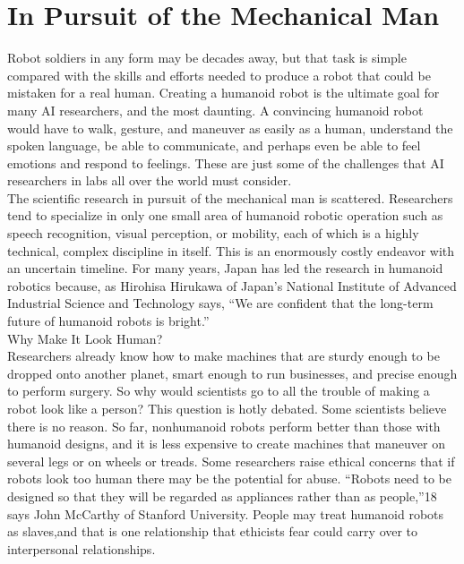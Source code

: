 \documentclass[12pt]{article}
\begin{document}
\section{\textbf{In Pursuit of the Mechanical Man}}
\large\flushleft 

Robot soldiers in any form may be decades away, but that task is simple compared with the skills and efforts needed to produce a robot that could be mistaken for a real human. Creating a humanoid robot is the ultimate goal for many AI researchers, and the most daunting. A convincing humanoid robot would have to walk, gesture, and maneuver as easily as a human, understand the spoken language, be able to communicate, and perhaps even be able to feel emotions and respond to feelings. These are just some of the challenges that AI researchers in labs all over the world must consider.\\
 The scientific research in pursuit of the mechanical man is scattered. Researchers tend to specialize in only one small area of humanoid robotic operation such as speech recognition, visual perception, or mobility, each of which is a highly technical, complex discipline in itself. This is an enormously costly endeavor with an uncertain timeline. For many years, Japan has led the research in humanoid robotics because, as Hirohisa Hirukawa of Japan’s National Institute of Advanced Industrial Science and Technology says, “We are confident that the long-term future of humanoid robots is bright.”\\
\huge
Why Make It Look Human?\\
\large
 Researchers already know how to make machines that are sturdy enough to be dropped onto another planet, smart enough to run businesses, and precise enough to perform surgery. So why would scientists go to all the trouble of making a robot look like a person? This question is hotly debated. Some scientists believe there is no reason. So far, nonhumanoid robots perform better than those with humanoid designs, and it is less expensive to create machines that maneuver on several legs or on wheels or treads. Some researchers raise ethical concerns that if robots look too human there may be the potential for abuse. “Robots need to be designed so that they will be regarded as appliances rather than as people,”18 says John McCarthy of Stanford University. People may treat humanoid robots as slaves,and that is one relationship that ethicists fear could carry over to interpersonal relationships.\\
 \huge
\end{document}
